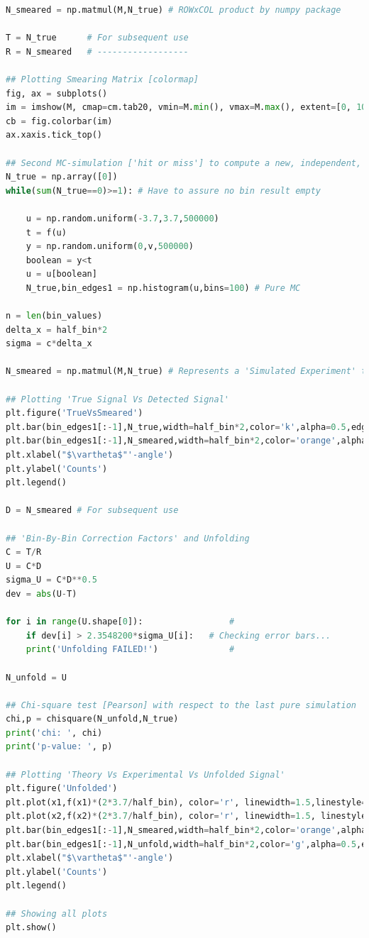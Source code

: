 \begin{lstlisting}[language=python, style=Pystyle, caption=\texttt{Python} code for Exercise 6 (Smearing and Unfolding routines), label=list:Diffraction, 	captionpos=b]
N_smeared = np.matmul(M,N_true) # ROWxCOL product by numpy package

T = N_true      # For subsequent use
R = N_smeared   # ------------------

## Plotting Smearing Matrix [colormap]
fig, ax = subplots()
im = imshow(M, cmap=cm.tab20, vmin=M.min(), vmax=M.max(), extent=[0, 100, 100, 0])
cb = fig.colorbar(im)
ax.xaxis.tick_top()

## Second MC-simulation ['hit or miss'] to compute a new, independent, N_smeared [D != R]
N_true = np.array([0])
while(sum(N_true==0)>=1): # Have to assure no bin result empty

	u = np.random.uniform(-3.7,3.7,500000)
	t = f(u)
	y = np.random.uniform(0,v,500000)
	boolean = y<t
	u = u[boolean]
	N_true,bin_edges1 = np.histogram(u,bins=100) # Pure MC

n = len(bin_values)
delta_x = half_bin*2
sigma = c*delta_x

N_smeared = np.matmul(M,N_true) # Represents a 'Simulated Experiment' to unfold...

## Plotting 'True Signal Vs Detected Signal'
plt.figure('TrueVsSmeared')
plt.bar(bin_edges1[:-1],N_true,width=half_bin*2,color='k',alpha=0.5,edgecolor='k',label='Pure MC')
plt.bar(bin_edges1[:-1],N_smeared,width=half_bin*2,color='orange',alpha=0.6,edgecolor='k',label='Smeared')
plt.xlabel("$\vartheta$"'-angle')
plt.ylabel('Counts')
plt.legend()

D = N_smeared # For subsequent use

## 'Bin-By-Bin Correction Factors' and Unfolding
C = T/R
U = C*D
sigma_U = C*D**0.5
dev = abs(U-T)

for i in range(U.shape[0]):					#
	if dev[i] > 2.3548200*sigma_U[i]:	# Checking error bars...
	print('Unfolding FAILED!')				#

N_unfold = U

## Chi-square test [Pearson] with respect to the last pure simulation
chi,p = chisquare(N_unfold,N_true)
print('chi: ', chi)
print('p-value: ', p)

## Plotting 'Theory Vs Experimental Vs Unfolded Signal'
plt.figure('Unfolded')
plt.plot(x1,f(x1)*(2*3.7/half_bin), color='r', linewidth=1.5,linestyle='--',label='Theory')
plt.plot(x2,f(x2)*(2*3.7/half_bin), color='r', linewidth=1.5, linestyle='--')
plt.bar(bin_edges1[:-1],N_smeared,width=half_bin*2,color='orange',alpha=0.6,edgecolor='k',label='Experimental')
plt.bar(bin_edges1[:-1],N_unfold,width=half_bin*2,color='g',alpha=0.5,edgecolor='k',label='Unfolded')
plt.xlabel("$\vartheta$"'-angle')
plt.ylabel('Counts')
plt.legend()

## Showing all plots
plt.show()
\end{lstlisting}

\newpage